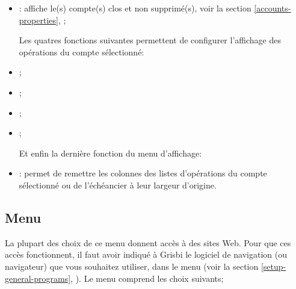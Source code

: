 \begin{itemize}
	\item {}: affiche le(s) compte(s) clos et non supprimé(s), voir la section \vref{accounts-properties}, ;
\begin{addmargin*}[-10pt]{0cm} 	%
	Les quatres fonctions suivantes permettent de configurer l'affichage des opérations du compte sélectionné:
\end{addmargin*}
	\item {};
	\item {};
	\item {};
	\item {};
\begin{addmargin*}[-10pt]{0cm} 	%
	Et enfin la dernière fonction du menu d'affichage:
\end{addmargin*}	
	\item {}: permet de remettre les colonnes des listes d'opérations du compte sélectionné ou de l'échéancier à leur largeur d'origine.
\end{itemize}


\subsection{Menu \label{home-menus-help}}

La plupart des choix de ce menu donnent accès à des sites Web. Pour que ces accès fonctionnent, il faut avoir indiqué à Grisbi le logiciel de navigation (ou navigateur) que vous souhaitez utiliser, dans le menu  (voir la section \vref{setup-general-programs}, ). Le menu  comprend les choix suivants;

